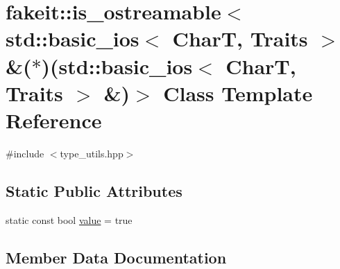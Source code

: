 \hypertarget{classfakeit_1_1is__ostreamable_3_01std_1_1basic__ios_3_01CharT_00_01Traits_01_4_01_6_07_5_08_07s858900d5afa7b057943113e46fead66f}{}\section{fakeit\+::is\+\_\+ostreamable$<$ std\+::basic\+\_\+ios$<$ CharT, Traits $>$ \&($\ast$)(std\+::basic\+\_\+ios$<$ CharT, Traits $>$ \&)$>$ Class Template Reference}
\label{classfakeit_1_1is__ostreamable_3_01std_1_1basic__ios_3_01CharT_00_01Traits_01_4_01_6_07_5_08_07s858900d5afa7b057943113e46fead66f}


{\ttfamily \#include $<$type\+\_\+utils.\+hpp$>$}

\subsection*{Static Public Attributes}
\begin{DoxyCompactItemize}
\item 
static const bool \mbox{\hyperlink{classfakeit_1_1is__ostreamable_3_01std_1_1basic__ios_3_01CharT_00_01Traits_01_4_01_6_07_5_08_07s858900d5afa7b057943113e46fead66f_a1ef0819297d270539b6d1dd7498cc0c5}{value}} = true
\end{DoxyCompactItemize}


\subsection{Member Data Documentation}
\mbox{\label{classfakeit_1_1is__ostreamable_3_01std_1_1basic__ios_3_01CharT_00_01Traits_01_4_01_6_07_5_08_07s858900d5afa7b057943113e46fead66f_a1ef0819297d270539b6d1dd7498cc0c5}} 
